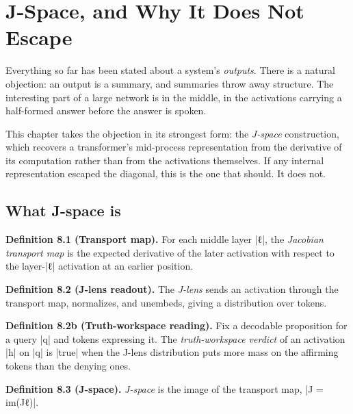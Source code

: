 \documentclass{memoir}
\begin{document}
\chapter{J-Space, and Why It Does Not Escape}\label{Two--Schemas--of--Impossibility-005F-005F-005F--Machine--Checked--Limits--of--Trustworthy--Machine--Learning-005F-005F-005F--and--Why--They--Tighten--with--Capability----J--Space-005F-005F-005F--and--Why--It--Does--Not--Escape}

Everything so far has been stated about a system's \emph{outputs}. There is a natural
objection: an output is a summary, and summaries throw away structure. The
interesting part of a large network is in the middle, in the activations
carrying a half-formed answer before the answer is spoken.

This chapter takes the objection in its strongest form: the \emph{J-space}
construction, which recovers a transformer's mid-process representation from the
derivative of its computation rather than from the activations themselves. If
any internal representation escaped the diagonal, this is the one that should.
It does not.



\section{What J-space is}\label{Two--Schemas--of--Impossibility-005F-005F-005F--Machine--Checked--Limits--of--Trustworthy--Machine--Learning-005F-005F-005F--and--Why--They--Tighten--with--Capability----J--Space-005F-005F-005F--and--Why--It--Does--Not--Escape----What--J--space--is}

\textbf{Definition 8.1 (Transport map).} For each middle layer \LeanVerb|ℓ|, the \emph{Jacobian transport
map} is the expected derivative of the later activation with respect to the
layer-\LeanVerb|ℓ| activation at an earlier position.

\textbf{Definition 8.2 (J-lens readout).} The \emph{J-lens} sends an activation through the
transport map, normalizes, and unembeds, giving a distribution over tokens.

\textbf{Definition 8.2b (Truth-workspace reading).} Fix a decodable proposition for a query
\LeanVerb|q| and tokens expressing it. The \emph{truth-workspace verdict} of an activation \LeanVerb|h|
on \LeanVerb|q| is \LeanVerb|true| when the J-lens distribution puts more mass on the affirming
tokens than the denying ones.

\textbf{Definition 8.3 (J-space).} \emph{J-space} is the image of the transport map,
\LeanVerb|J = im(Jℓ)|.
\end{document}
